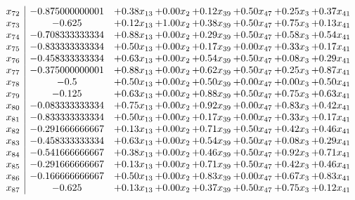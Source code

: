 \documentclass[8pt]{article}
\begin{document}
\[\begin{array}{c| c c@{\hskip 2pt} c@{\hskip 2pt} c@{\hskip 2pt} c@{\hskip 2pt} c@{\hskip 2pt} c@{\hskip 2pt} }
 x_{72}   &  -0.875000000001 & +  0.38 x_{13} & +  0.00 x_{2} & +  0.12 x_{39} & +  0.50 x_{47} & +  0.25 x_{3} & +  0.37 x_{41}\\
 x_{73}   &  -0.625 & +  0.12 x_{13} & +  1.00 x_{2} & +  0.38 x_{39} & +  0.50 x_{47} & +  0.75 x_{3} & +  0.13 x_{41}\\
 x_{74}   &  -0.708333333334 & +  0.88 x_{13} & +  0.00 x_{2} & +  0.29 x_{39} & +  0.50 x_{47} & +  0.58 x_{3} & +  0.54 x_{41}\\
 x_{75}   &  -0.833333333334 & +  0.50 x_{13} & +  0.00 x_{2} & +  0.17 x_{39} & +  0.00 x_{47} & +  0.33 x_{3} & +  0.17 x_{41}\\
 x_{76}   &  -0.458333333334 & +  0.63 x_{13} & +  0.00 x_{2} & +  0.54 x_{39} & +  0.50 x_{47} & +  0.08 x_{3} & +  0.29 x_{41}\\
 x_{77}   &  -0.375000000001 & +  0.88 x_{13} & +  0.00 x_{2} & +  0.62 x_{39} & +  0.50 x_{47} & +  0.25 x_{3} & +  0.87 x_{41}\\
 x_{78}   &  -0.5 & +  0.50 x_{13} & +  0.00 x_{2} & +  0.50 x_{39} & +  0.00 x_{47} & +  0.00 x_{3} & +  0.50 x_{41}\\
 x_{79}   &  -0.125 & +  0.63 x_{13} & +  0.00 x_{2} & +  0.88 x_{39} & +  0.50 x_{47} & +  0.75 x_{3} & +  0.63 x_{41}\\
 x_{80}   &  -0.083333333334 & +  0.75 x_{13} & +  0.00 x_{2} & +  0.92 x_{39} & +  0.00 x_{47} & +  0.83 x_{3} & +  0.42 x_{41}\\
 x_{81}   &  -0.833333333334 & +  0.50 x_{13} & +  0.00 x_{2} & +  0.17 x_{39} & +  0.00 x_{47} & +  0.33 x_{3} & +  0.17 x_{41}\\
 x_{82}   &  -0.291666666667 & +  0.13 x_{13} & +  0.00 x_{2} & +  0.71 x_{39} & +  0.50 x_{47} & +  0.42 x_{3} & +  0.46 x_{41}\\
 x_{83}   &  -0.458333333334 & +  0.63 x_{13} & +  0.00 x_{2} & +  0.54 x_{39} & +  0.50 x_{47} & +  0.08 x_{3} & +  0.29 x_{41}\\
 x_{84}   &  -0.541666666667 & +  0.38 x_{13} & +  0.00 x_{2} & +  0.46 x_{39} & +  0.50 x_{47} & +  0.92 x_{3} & +  0.71 x_{41}\\
 x_{85}   &  -0.291666666667 & +  0.13 x_{13} & +  0.00 x_{2} & +  0.71 x_{39} & +  0.50 x_{47} & +  0.42 x_{3} & +  0.46 x_{41}\\
 x_{86}   &  -0.166666666667 & +  0.50 x_{13} & +  0.00 x_{2} & +  0.83 x_{39} & +  0.00 x_{47} & +  0.67 x_{3} & +  0.83 x_{41}\\
 x_{87}   &  -0.625 & +  0.13 x_{13} & +  0.00 x_{2} & +  0.37 x_{39} & +  0.50 x_{47} & +  0.75 x_{3} & +  0.12 x_{41}\\

\end{array}\]
\end{document}
